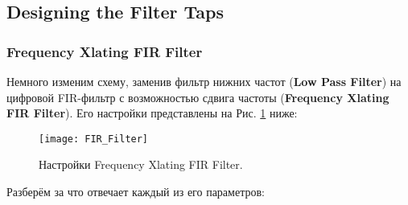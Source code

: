 \documentclass[a4paper,12pt]{extarticle}
\begin{document}
\newpage
\subsection{Designing the Filter Taps}

\subsubsection{Frequency Xlating FIR Filter}

\hspace{1.15cm}Немного изменим схему, заменив фильтр нижних частот (\textbf{Low Pass Filter}) на цифровой FIR-фильтр 
с возможностью сдвига частоты (\textbf{Frequency Xlating FIR Filter}). Его настройки представлены на Рис. 
\ref{fig:FIR_Filter} ниже:\\
\begin{figure}[H]
    \centering
    \texttt{[image: FIR\_Filter]}
    \caption{Настройки Frequency Xlating FIR Filter.} %
    \label{fig:FIR_Filter} %
\end{figure}
Разберём за что отвечает каждый из его параметров:
\vspace{0.15cm}
\end{document}
